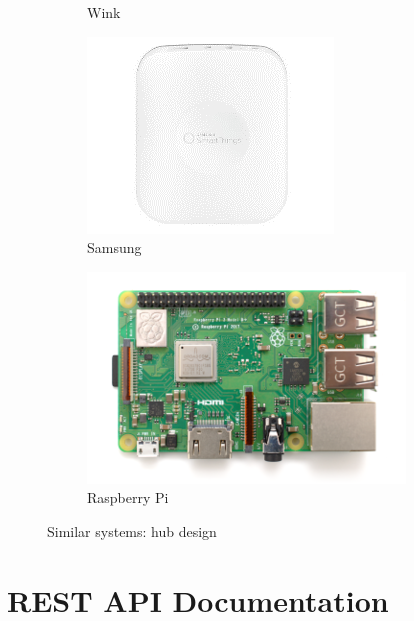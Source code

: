 \documentclass[12pt, oneside, a4paper]{book}
\begin{document}
\begin{figure}[H]
\begin{subfigure}[b]{.5\linewidth}
				\caption{Wink}
			\end{subfigure}
			\begin{subfigure}[b]{.5\linewidth}
			\includegraphics[width=\linewidth]{img/samsung_hw.png}
				\caption{Samsung}
			\end{subfigure}
			\begin{subfigure}[b]{.5\linewidth}
				\includegraphics[width=\linewidth]{img/raspberry.png}
				\caption{Raspberry Pi}
			\end{subfigure}
			\caption{Similar systems: hub design}
		\end{figure}

		\newpage\chapter{REST API Documentation}
		\label{appendix:api_doc}
		
\end{document}
